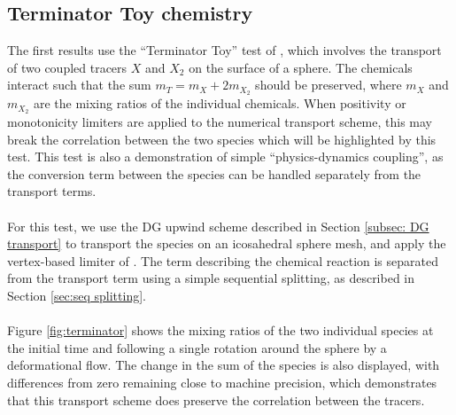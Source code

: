 \documentclass[journal abbreviation, manuscript]{copernicus}
\begin{document}
\subsection{Terminator Toy chemistry}
The first results use the ``Terminator Toy'' test of \citet{lauritzen2015terminator}, which involves the transport of two coupled tracers $X$ and $X_2$ on the surface of a sphere.
The chemicals interact such that the sum $m_T=m_X+2m_{X_2}$ should be preserved, where $m_X$ and $m_{X_2}$ are the mixing ratios of the individual chemicals.
When positivity or monotonicity limiters are applied to the numerical transport scheme, this may break the correlation between the two species which will be highlighted by this test.
This test is also a demonstration of simple ``physics-dynamics coupling'', as the conversion term between the species can be handled separately from the transport terms. \\
\\
For this test, we use the DG upwind scheme described in Section \ref{subsec: DG transport} to transport the species on an icosahedral sphere mesh, and apply the vertex-based limiter of \citet{kuzmin2010vertex}.
The term describing the chemical reaction is separated from the transport term using a simple sequential splitting, as described in Section \ref{sec:seq splitting}. \\
\\
Figure \ref{fig:terminator} shows the mixing ratios of the two individual species at the initial time and following a single rotation around the sphere by a deformational flow.
The change in the sum of the species is also displayed, with differences from zero remaining close to machine precision, which demonstrates that this transport scheme does preserve the correlation between the tracers. 
\end{document}
